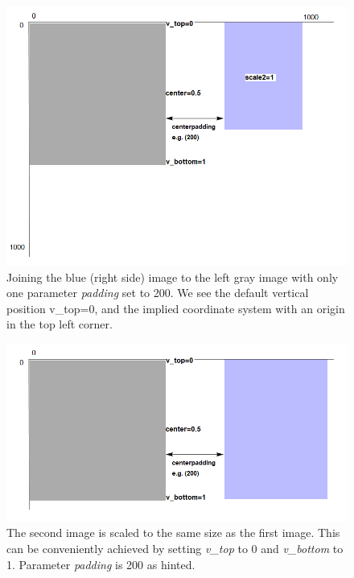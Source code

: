\documentclass[a4paper, 12pt, bibliography=totoc]{scrartcl}
\begin{document}
\begin{figure}[H]
	\centering
	\includegraphics[width=0.8\linewidth]{images/svgjoinpad200.png}
	\caption[Joining with padding]{Joining the blue (right side) image to the left gray image with only one parameter \textit{padding} set to 200. We see the default vertical position v\_top=0, and the implied coordinate system with an origin in the top left corner.}
	\label{fig:svgjoinpad200}
\end{figure}

\begin{figure}[H]
	\centering
	\includegraphics[width=0.8\linewidth]{images/svgjoinscale1.png}
	\caption[Joining with same size]{The second image is scaled to the same size as the first image. This can be conveniently achieved by setting \textit{v\_top} to 0 and \textit{v\_bottom} to 1. Parameter \textit{padding} is 200 as hinted.}
	\label{fig:svgjoinscale1}
\end{figure}
\end{document}
